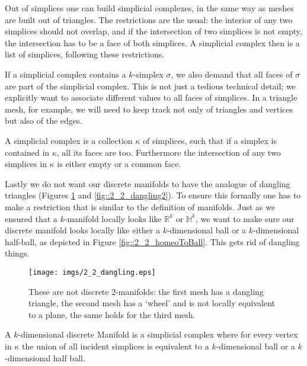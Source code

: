 Out of simplices one can build simplicial complexes, in the same way as meshes are built out of triangles. The restrictions are the usual: the interior of any two simplices should not overlap, and if the intersection of two simplices is not empty, the intersection has to be a face of both simplices. A simplicial complex then is a list of simplices, following these restrictions. 

If a simplicial complex contains a  $k$-simplex $\sigma$, we also demand that all faces of $\sigma$ are part of the simplicial complex. This is not just a tedious technical detail;  we explicitly want to associate different values to all faces of simplices. In a triangle mesh, for example, we will need to keep track not only of triangles and vertices but also of the edges.

\begin{definition}
A simplicial  complex is a collection $\kappa$ of simplices, such that if a simplex is contained in $\kappa$, all its faces are too. Furthermore the intersection of any two simplices in  $\kappa$ is either empty or a common face.
\end{definition}

Lastly we do not want our discrete manifolds  to have the analogue of dangling triangles (Figures \ref{fig::2_2_dangling} and \ref{fig::2_2_dangling2}). To ensure this formally one has to make a restriction that is similar to the definition of manifolds. Just as we ensured that a $k$-manifold locally looks like $\mathbb R^k$ or $\mathbb H^k$, we want to make sure our discrete manifold looks locally like either a $k$-dimensional ball or a $k$-dimensional half-ball, as depicted in Figure \ref{fig::2_2_homeoToBall}. This gets rid of dangling things.

\begin{figure}
\begin{center}
\texttt{[image: imgs/2\_2\_dangling.eps]}
\caption{These are not discrete 2-manifolds: the first mesh has a dangling triangle, the second mesh has a `wheel' and is not locally equivalent to a plane, the same holds for the third mesh.}
\label{fig::2_2_dangling}
\end{center}
\end{figure}

\begin{definition}
A $k$-dimensional discrete Manifold is a simplicial complex where for every vertex in $\kappa$ the union of all incident simplices is equivalent to a $k$-dimensional ball or a $k$-dimensional half ball.
\end{definition} 

